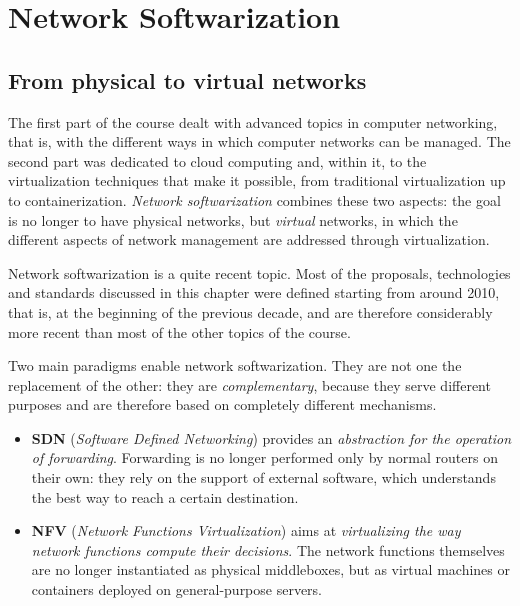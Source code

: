 \chapter{Network Softwarization}

\section{From physical to virtual networks}

The first part of the course dealt with advanced topics in computer networking, that is, with the different ways in which computer networks can be managed. The second part was dedicated to cloud computing and, within it, to the virtualization techniques that make it possible, from traditional virtualization up to containerization. \emph{Network softwarization} combines these two aspects: the goal is no longer to have physical networks, but \emph{virtual} networks, in which the different aspects of network management are addressed through virtualization.

Network softwarization is a quite recent topic. Most of the proposals, technologies and standards discussed in this chapter were defined starting from around 2010, that is, at the beginning of the previous decade, and are therefore considerably more recent than most of the other topics of the course.

Two main paradigms enable network softwarization. They are not one the replacement of the other: they are \emph{complementary}, because they serve different purposes and are therefore based on completely different mechanisms.

\begin{itemize}
\item \textbf{SDN} (\emph{Software Defined Networking}) provides an \emph{abstraction for the operation of forwarding}. Forwarding is no longer performed only by normal routers on their own: they rely on the support of external software, which understands the best way to reach a certain destination.
\item \textbf{NFV} (\emph{Network Functions Virtualization}) aims at \emph{virtualizing the way network functions compute their decisions}. The network functions themselves are no longer instantiated as physical middleboxes, but as virtual machines or containers deployed on general-purpose servers.
\end{itemize}

